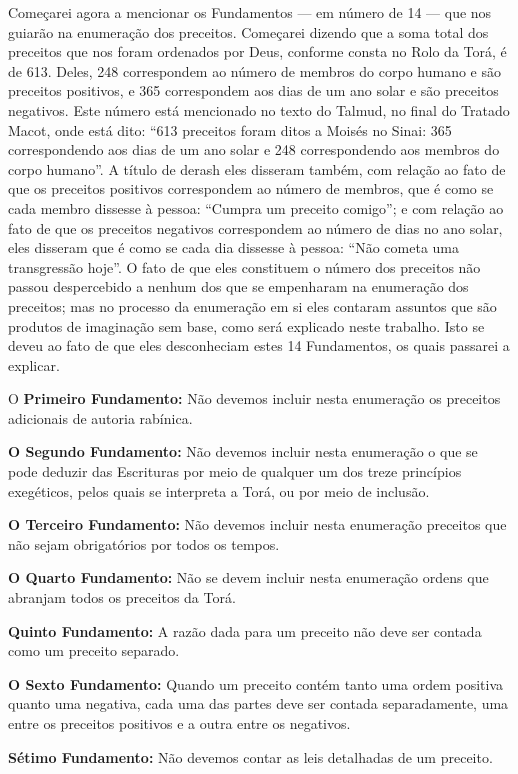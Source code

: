 Começarei agora a mencionar os Fundamentos --- em número de 14 ---
que nos guiarão na enumeração dos preceitos. Começarei dizendo que a
soma total dos preceitos que nos foram ordenados por Deus, conforme
consta no Rolo da Torá, é de 613. Deles,
248 correspondem ao número de membros do corpo
humano e são preceitos positivos, e 365
correspondem aos dias de um ano solar e são preceitos negativos. Este
número está mencionado no texto do Talmud, no final do Tratado Macot,
onde está dito: ``613 preceitos foram ditos a Moisés no
Sinai: 365 correspondendo aos dias de um ano
solar e 248 correspondendo aos membros do corpo
humano''. A título de derash\starr{} eles disseram
também, com relação ao fato de que os preceitos positivos correspondem
ao número de membros, que é como se cada membro dissesse à pessoa:
``Cumpra um preceito comigo''; e com relação ao fato de que os
preceitos negativos correspondem ao número de dias no ano solar, eles
disseram que é como se cada dia dissesse à pessoa: ``Não cometa uma
transgressão hoje''. O fato de que eles constituem o número dos
preceitos não passou despercebido a nenhum dos que se empenharam na
enumeração dos preceitos; mas no processo da enumeração em si eles
contaram assuntos que são produtos de imaginação sem base, como será
explicado neste trabalho. Isto se deveu ao fato de que eles
desconheciam estes 14 Fundamentos, os quais passarei a explicar.

O \textbf{Primeiro Fundamento:} Não devemos incluir nesta enumeração os
preceitos adicionais de autoria rabínica.

\textbf{O Segundo Fundamento:} Não devemos incluir nesta enumeração o
que se pode deduzir das Escrituras por meio de qualquer um dos treze
princípios exegéticos, pelos quais se interpreta a Torá, ou por meio
de inclusão.

\textbf{O Terceiro Fundamento:} Não devemos incluir nesta enumeração
preceitos que não sejam obrigatórios por todos os tempos.

\textbf{O Quarto Fundamento:} Não se devem incluir nesta enumeração
ordens que abranjam todos os preceitos da Torá.

\textbf{Quinto Fundamento:} A razão dada para um preceito não deve ser
contada como um preceito separado.

\textbf{O Sexto Fundamento:} Quando um preceito contém tanto uma ordem
positiva quanto uma negativa, cada uma das partes deve ser contada
separadamente, uma entre os preceitos positivos e a outra entre os
negativos.

\textbf{Sétimo Fundamento:} Não devemos contar as leis detalhadas de
um preceito.

